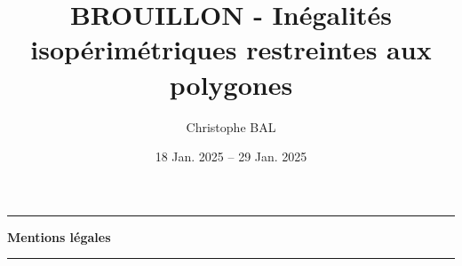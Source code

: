 \documentclass[12pt]{amsart}
\begin{document}
\title{BROUILLON - Inégalités isopérimétriques restreintes aux polygones}
\author{Christophe BAL}
\date{18 Jan. 2025 -- 29 Jan. 2025}
\maketitle


\begin{center}
	\hrule\vspace{.3em}
	{
		\fontsize{1.35em}{1em}\selectfont
		\textbf{Mentions \og légales \fg}
	}
			
	\vspace{0.45em}
	\doclicenseThis
	\hrule
\end{center}



\setcounter{tocdepth}{2}
\tableofcontents




\newpage
\end{document}
